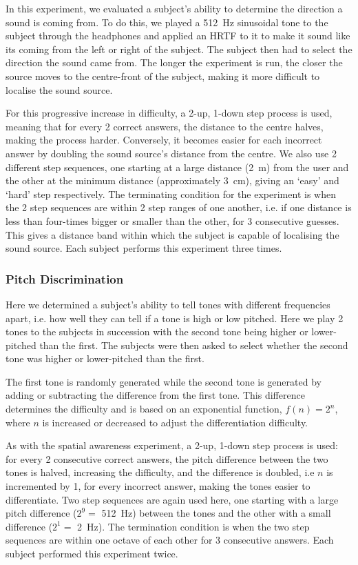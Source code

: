 \documentclass[format=sigconf, review=true, screen=true, anonymous=true]{acmart}
\begin{document}
In this experiment, we evaluated a subject's ability to determine the direction a sound is coming from. To do this, we played a \SI{512}{\hertz} sinusoidal tone to the subject through the headphones and applied an HRTF to it to make it sound like its coming from the left or right of the subject. The subject then had to select the direction the sound came from. The longer the experiment is run, the closer the source moves to the centre-front of the subject, making it more difficult to localise the sound source. 

For this progressive increase in difficulty, a 2-up, 1-down step process is used, meaning that for every 2 correct answers, the distance to the centre halves, making the process harder. Conversely, it becomes easier for each incorrect answer by doubling the sound source's distance from the centre. We also use 2 different step sequences, one starting at a large distance (\SI{2}{\m}) from the user and the other at the minimum distance (approximately \SI{3}{\cm}), giving an `easy' and `hard' step respectively. The terminating condition for the experiment is when the 2 step sequences are within 2 step ranges of one another, i.e. if one distance is less than four-times bigger or smaller than the other, for 3 consecutive guesses. This gives a distance band within which the subject is capable of localising the sound source. Each subject performs this experiment three times. 

\subsubsection{Pitch Discrimination}

Here we determined a subject's ability to tell tones with different frequencies apart, i.e. how well they can tell if a tone is high or low pitched. Here we play 2 tones to the subjects in succession with the second tone being higher or lower-pitched than the first. The subjects were then asked to select whether the second tone was higher or lower-pitched than the first.

The first tone is randomly generated while the second tone is generated by adding or subtracting the difference from the first tone. This difference determines the difficulty and is based on an exponential function, $f(n) = 2^n$, where $n$ is increased or decreased to adjust the differentiation difficulty. 

As with the spatial awareness experiment, a 2-up, 1-down step process is used: for every 2 consecutive correct answers, the pitch difference between the two tones is halved, increasing the difficulty, and the difference is doubled, i.e $n$ is incremented by 1, for every incorrect answer, making the tones easier to differentiate. Two step sequences are again used here, one starting with a large pitch difference ($2^9=$ \SI{512}{\hertz}) between the tones and the other with a small difference ($2^1=$ \SI{2}{\hertz}). The termination condition is when the two step sequences are within one octave of each other for 3 consecutive answers. Each subject performed this experiment twice. 
\end{document}
